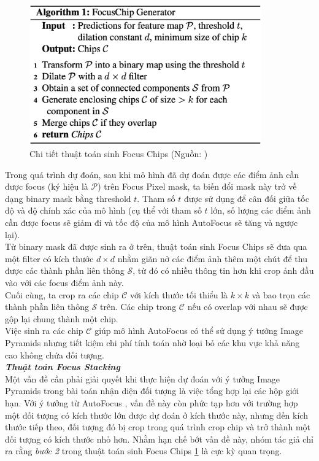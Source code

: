 {    \begin{figure}[H]
        \centering
        \includegraphics[width=10cm] {images/autofocus_focus_chip_gen}
        \caption{Chi tiết thuật toán sinh Focus Chips (Nguồn: \cite{najibi2019autofocus})}
        \label{fig:autofocus_focus_chip_gen}
    \end{figure}

    \noindent
    Trong quá trình dự đoán, sau khi mô hình đã dự đoán được các điểm ảnh cần được focus (ký hiệu là $\mathcal{P}$) trên Focus Pixel  mask, ta biến đổi mask này trở về dạng binary mask bằng threshold $t$.
    Tham số $t$ được sử dụng để cân đối giữa tốc độ và độ chính xác của mô hình (cụ thể với tham số $t$ lớn, số lượng các điểm ảnh cần được focus sẽ giảm đi và tốc độ của mô hình AutoFocus sẽ tăng và ngược lại). \\
    Từ binary mask đã được sinh ra ở trên, thuật toán sinh Focus Chips sẽ đưa qua một filter có kích thước $d \times d$ nhằm giãn nở các điểm ảnh thêm một chút để thu được các thành phần liên thông $\mathcal{S}$, từ đó có nhiều thông tin hơn khi crop ảnh đầu vào với các focus điểm ảnh này. \\
    Cuối cùng, ta crop ra các chip $\mathcal{C}$ với kích thước tối thiểu là $k \times k$ và bao trọn các thành phần liên thông $\mathcal{S}$ trên.
    Các chip trong $\mathcal{C}$ nếu có overlap với nhau sẽ được gộp lại chung thành một chip. \\
    Việc sinh ra các chip $\mathcal{C}$ giúp mô hình AutoFocus có thể sử dụng ý tưởng Image Pyramids nhưng tiết kiệm chi phí tính toán nhờ loại bỏ các khu vực khả năng cao không chứa đối tượng. \\

    \noindent
    \textbf{\textit{Thuật toán Focus Stacking}} \\
    Một vấn đề cần phải giải quyết khi thực hiện dự đoán với ý tưởng Image Pyramids trong bài toán nhận diện đối tượng là việc tổng hợp lại các hộp giới hạn.
    Với ý tưởng từ AutoFocus \cite{najibi2019autofocus}, vấn đề này còn phức tạp hơn với trường hợp một đối tượng có kích thước lớn được dự đoán ở kích thước này, nhưng đến kích thước tiếp theo, đối tượng đó bị crop trong quá trình crop chip và trở thành một đối tượng có kích thước nhỏ hơn.
    Nhằm hạn chế bớt vấn đề này, nhóm tác giả chỉ ra rằng \textit{bước 2} trong thuật toán sinh Focus Chips \ref{fig:autofocus_focus_chip_gen} là cực kỳ quan trọng.

}
